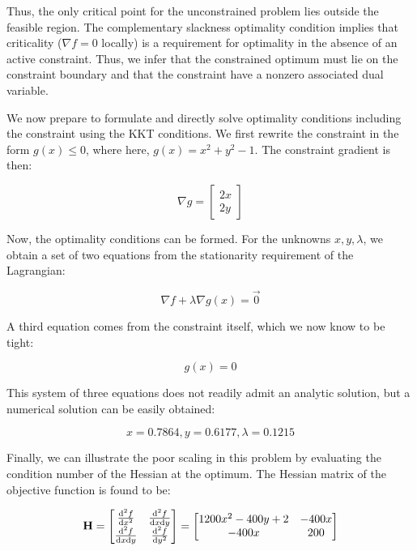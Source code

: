 Thus, the only critical point for the unconstrained problem lies outside the feasible region. The complementary slackness optimality condition implies that criticality ($\nabla f = 0$ locally) is a requirement for optimality in the absence of an active constraint. Thus, we infer that the constrained optimum must lie on the constraint boundary and that the constraint have a nonzero associated dual variable.

We now prepare to formulate and directly solve optimality conditions including the constraint using the KKT conditions. We first rewrite the constraint in the form $g(x) \leq 0$, where here, $g(x) = x^2+y^2-1$. The constraint gradient is then:

\begin{equation}
    \nabla g =
    \begin{bmatrix}
        2x \\
        2y
    \end{bmatrix}
\end{equation}

Now, the optimality conditions can be formed. For the unknowns $x, y, \lambda$, we obtain a set of two equations from the stationarity requirement of the Lagrangian:

\begin{equation}
    \nabla f + \lambda \nabla g(x) = \vec{0}
\end{equation}

A third equation comes from the constraint itself, which we now know to be tight:

\begin{equation}
    g(x) = 0
\end{equation}

This system of three equations does not readily admit an analytic solution, but a numerical solution can be easily obtained:

\begin{equation}
    x = 0.7864, y = 0.6177, \lambda = 0.1215
    \label{eq:constrained-rosen-solution}
\end{equation}

Finally, we can illustrate the poor scaling in this problem by evaluating the condition number of the Hessian at the optimum. The Hessian matrix of the objective function is found to be:

\begin{equation}
    \mathbf{H} =
    \begin{bmatrix}
        \frac{\mathrm{d}^2 f}{\mathrm{d} x^2} & \frac{\mathrm{d}^2 f}{\mathrm{d} x \mathrm{d} y} \\
        \frac{\mathrm{d}^2 f}{\mathrm{d} x \mathrm{d} y} & \frac{\mathrm{d}^2 f}{\mathrm{d} y^2}
    \end{bmatrix} =
    \begin{bmatrix}
        1200x^2 - 400y + 2 & -400x \\
        -400x & 200
    \end{bmatrix}
\end{equation}

